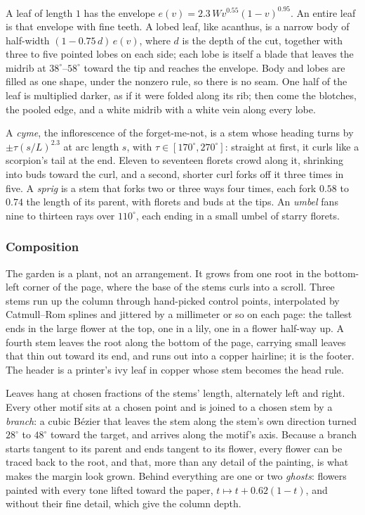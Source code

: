 \startconstruction[title={Leaves}]
A leaf of length $1$ has the envelope $e(v)=2.3\,W v^{0.55}(1-v)^{0.95}$. An entire leaf is
that envelope with fine teeth. A lobed leaf, like acanthus, is a narrow body of half-width
$(1-0.75\,d)\,e(v)$, where $d$ is the depth of the cut, together with three to five pointed
lobes on each side; each lobe is itself a blade that leaves the midrib at
$38^\circ$–$58^\circ$ toward the tip and reaches the envelope. Body and lobes are filled as
one shape, under the nonzero rule, so there is no seam. One half of the leaf is multiplied
darker, as if it were folded along its rib; then come the blotches, the pooled edge, and a
white midrib with a white vein along every lobe.
\stopconstruction

\startconstruction[title={Sprays}]
A \emph{cyme}, the inflorescence of the forget-me-not, is a stem whose heading turns by
$\pm\tau(s/L)^{2.3}$ at arc length $s$, with $\tau\in[170^\circ,270^\circ]$: straight at first,
it curls like a scorpion's tail at the end. Eleven to seventeen florets crowd along it,
shrinking into buds toward the curl, and a second, shorter curl forks off it three times in
five. A \emph{sprig} is a stem that forks two or three ways four times, each fork $0.58$ to
$0.74$ the length of its parent, with florets and buds at the tips. An \emph{umbel} fans nine
to thirteen rays over $110^\circ$, each ending in a small umbel of starry florets.
\stopconstruction

\subsubsection{Composition}

The garden is a plant, not an arrangement. It grows from one root in the bottom-left
corner of the page, where the base of the stems curls into a scroll. Three stems run up the
column through hand-picked control points, interpolated by Catmull–Rom splines and jittered
by a millimeter or so on each page: the tallest ends in the large flower at the top, one in
a lily, one in a flower half-way up. A fourth stem leaves the root along the bottom of the
page, carrying small leaves that thin out toward its end, and runs out into a copper
hairline; it is the footer. The header is a printer's ivy leaf in copper whose stem becomes
the head rule.

Leaves hang at chosen fractions of the stems' length, alternately left and right. Every
other motif sits at a chosen point and is joined to a chosen stem by a \emph{branch}: a cubic
Bézier that leaves the stem along the stem's own direction turned $28^\circ$ to $48^\circ$
toward the target, and arrives along the motif's axis. Because a branch starts tangent to
its parent and ends tangent to its flower, every flower can be traced back to the root, and
that, more than any detail of the painting, is what makes the margin look grown. Behind
everything are one or two \emph{ghosts}: flowers painted with every tone lifted toward the
paper, $t\mapsto t+0.62(1-t)$, and without their fine detail, which give the column depth.

